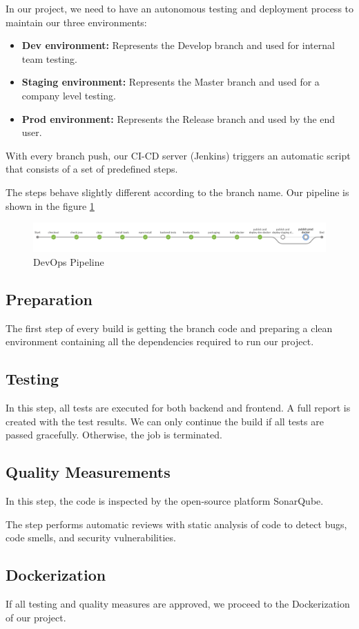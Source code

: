 \begin{spacing}{1.2}
In our project, we need to have an autonomous testing and deployment process to maintain our three environments:
\begin{itemize}
	\item \textbf{Dev environment:} Represents the Develop branch and used for internal team testing.
	\item \textbf{Staging environment:} Represents the Master branch and used for a company level testing.
    \item \textbf{Prod environment:} Represents the Release branch and used by the end user.
\end{itemize}

With every branch push, our CI-CD server (Jenkins) triggers an automatic script that consists of a set of predefined steps.

The steps behave slightly different according to the branch name.
Our pipeline is shown in the figure \ref{fig:jenkins}
\begin{figure}[!h]\centering
\includegraphics[scale=0.3]{jenkins.png}
\caption{DevOps Pipeline}
\label{fig:jenkins}
\end{figure}
\subsection{Preparation}
The first step of every build is getting the branch code and preparing a clean environment containing all the dependencies required to run our project.
\subsection{Testing}
In this step, all tests are executed for both backend and frontend. A full report is created with the test results.
We can only continue the build if all tests are passed gracefully. Otherwise, the job is terminated.
\subsection{Quality Measurements}
In this step, the code is inspected by the open-source platform SonarQube.

The step performs automatic reviews with static analysis of code to detect bugs, code smells, and security vulnerabilities.
\subsection{Dockerization}
If all testing and quality measures are approved, we proceed to the Dockerization of our project.
\newline


\end{spacing}
